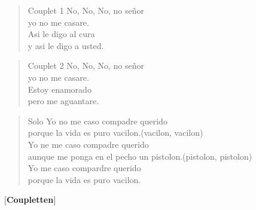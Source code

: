 \begin{verse}{Couplet 1}
No, No, No, no se\~nor\\
yo no me casare.\\
Asi le digo al cura\\
y asi le digo a usted.\\
\end{verse}
\begin{verse}{Couplet 2}
No, No, No, no se\~nor\\
yo no me casare.\\
Estoy enamorado\\
pero me aguantare.\\
\end{verse}

\begin{verse}{Solo}
 Yo no me caso compadre querido\\
porque la vida es puro vacilon.\hspace{8em}(vacilon, vacilon)\\
\chord{\hspace{1pt}}Yo ne me caso compadre querido\\
aunque me ponga en el pecho un pistolon.\hspace{3em}(pistolon, pistolon)\\
\chord{\hspace{1pt}}Yo me caso compardre querido\\
porque la vida es puro vacilon.\\
\end{verse}

\textbf{$[$Coupletten$]$}\\